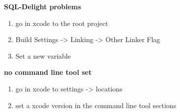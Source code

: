 \textbf{SQL-Delight problems}
\begin{enumerate}
    \item go in xcode to the root project
    \item Build Settings -> Linking -> Other Linker Flag
    \item Set a new variable 
\end{enumerate}


\textbf{no command line tool set}
\begin{enumerate}
    \item go in xcode to settings -> locations
    \item set a xcode version in the command line tool sections
\end{enumerate}


